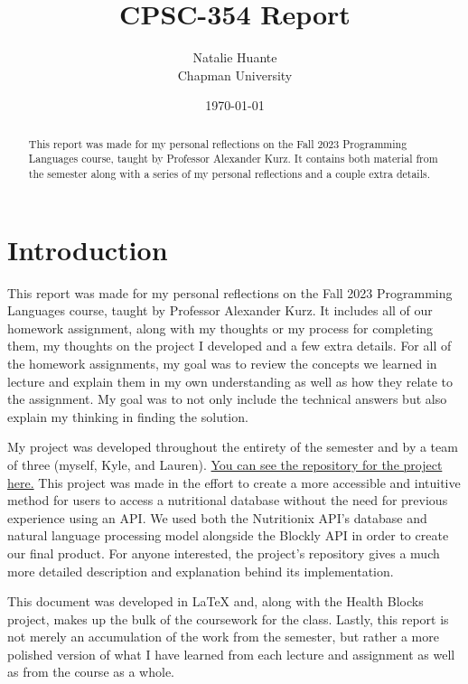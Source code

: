 \documentclass{article}
\title{CPSC-354 Report}
\author{Natalie Huante  \\ Chapman University}
\date{\today}
\theoremstyle{theorem}
\theoremstyle{definition}
\theoremstyle{remark}
\begin{document}
\maketitle

\begin{abstract}
This report was made for my personal reflections on the Fall 2023 Programming Languages course, taught by Professor Alexander Kurz. 
It contains both material from the semester along with a series of my personal reflections and a couple extra details.
\end{abstract}

\tableofcontents

\section{Introduction}\label{intro}

This report was made for my personal reflections on the Fall 2023 Programming Languages course, taught by Professor Alexander Kurz. It includes all of our homework assignment, 
along with my thoughts or my process for completing them, my thoughts on the project I developed and a few extra details. For all of the homework assignments, my goal was to 
review the concepts we learned in lecture and explain them in my own understanding as well as how they relate to the assignment. My goal was to not only include the technical
 answers but also explain my thinking in finding the solution. 


My project was developed throughout the entirety of the semester and by a team of three (myself, Kyle, and Lauren). 
\href{https://github.com/KyleWynne/Health_Blocks}{You can see the repository for the project here.}
This project was made in the effort to create a more accessible and intuitive method for users to access a nutritional database without the need for previous experience using 
an API. We used both the Nutritionix API's database and natural language processing model alongside the Blockly API in order to create our final product. For anyone interested, 
the project's repository gives a much more detailed description and explanation behind its implementation. 


This document was developed in LaTeX and, along with the Health Blocks project,  makes up the bulk of the coursework for the class. Lastly, this report is not merely an 
accumulation of the work from the semester, but rather a more polished version of what I have learned from each lecture and assignment as well as from the course as a whole. 
\end{document}
